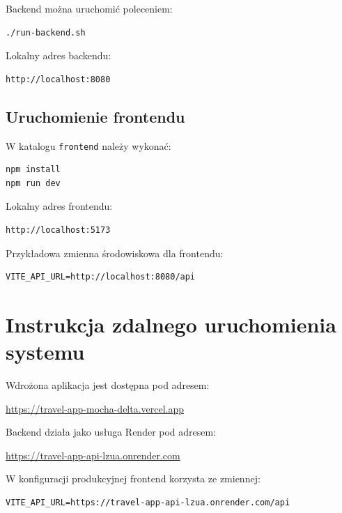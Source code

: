 \documentclass[12pt,a4paper]{article}
\begin{document}
Backend można uruchomić poleceniem:

\begin{verbatim}
./run-backend.sh
\end{verbatim}

Lokalny adres backendu:

\begin{verbatim}
http://localhost:8080
\end{verbatim}

\subsection{Uruchomienie frontendu}

W katalogu \texttt{frontend} należy wykonać:

\begin{verbatim}
npm install
npm run dev
\end{verbatim}

Lokalny adres frontendu:

\begin{verbatim}
http://localhost:5173
\end{verbatim}

Przykładowa zmienna środowiskowa dla frontendu:

\begin{verbatim}
VITE_API_URL=http://localhost:8080/api
\end{verbatim}

\section{Instrukcja zdalnego uruchomienia systemu}

Wdrożona aplikacja jest dostępna pod adresem:

\begin{center}
\url{https://travel-app-mocha-delta.vercel.app}
\end{center}

Backend działa jako usługa Render pod adresem:

\begin{center}
\url{https://travel-app-api-lzua.onrender.com}
\end{center}

W konfiguracji produkcyjnej frontend korzysta ze zmiennej:

\begin{verbatim}
VITE_API_URL=https://travel-app-api-lzua.onrender.com/api
\end{verbatim}
\end{document}
